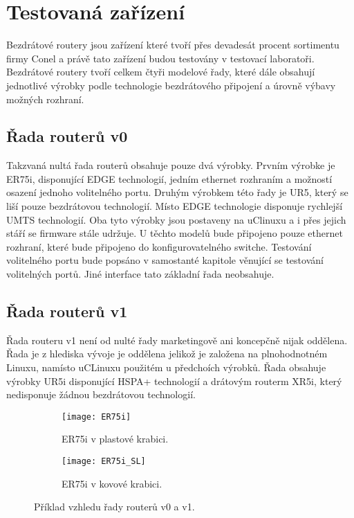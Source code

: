 \section{Testovaná zařízení}
Bezdrátové routery jsou zařízení které tvoří přes devadesát procent sortimentu firmy Conel a právě tato zařízení budou testovány v testovací laboratoři. Bezdrátové routery tvoří celkem čtyři modelové řady, které dále obsahují jednotlivé výrobky podle technologie bezdrátového připojení a úrovně výbavy možných rozhraní.

\subsection{Řada routerů v0}
Takzvaná nultá řada routerů obsahuje pouze dvá výrobky. Prvním výrobke je ER75i, disponující EDGE technologií, jedním ethernet rozhraním a možností osazení jednoho volitelného portu. Druhým výrobkem této řady je UR5, který se liší pouze bezdrátovou technologií. Místo EDGE technologie disponuje rychlejší UMTS technologií. Oba tyto výrobky jsou postaveny na uClinuxu a i přes jejich stáří se firmware stále udržuje. U těchto modelů bude připojeno pouze ethernet rozhraní, které bude připojeno do konfigurovatelného switche. Testování volitelného portu bude popsáno v samostanté kapitole věnující se testování volitelných portů. Jiné interface tato základní řada neobsahuje.

\subsection{Řada routerů v1}
Řada routeru v1 není od nulté řady marketingově ani koncepčně nijak oddělena. Řada je z hlediska vývoje je oddělena jelikož je založena na plnohodnotném Linuxu, namísto uCLinuxu použitém u předchoích výrobků. Řada obsahuje výrobky UR5i disponující HSPA+ technologií a drátovým routerm XR5i, který nedisponuje žádnou bezdrátovou technologií.

\begin{figure}[h]
  \begin{subfigure}[h]{0.5\LW}
    \centering
    \texttt{[image: ER75i]}
    \caption{ER75i v plastové krabici.}
    \label{fig:ER75i}
  \end{subfigure}
  \begin{subfigure}[h]{0.5\LW}
    \centering
    \texttt{[image: ER75i\_SL]}
    \caption{ER75i v kovové krabici.}
    \label{fig:ER75i SL}
  \end{subfigure}
  \caption{Příklad vzhledu řady routerů v0 a v1.}
  \label{fig:ER75i}
\end{figure}

